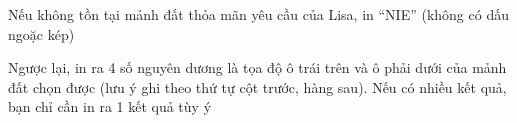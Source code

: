 Nếu không tồn tại mảnh đất thỏa mãn yêu cầu của Lisa, in “NIE” (không có dấu ngoặc kép)  

   Ngược lại, in ra 4 số nguyên dương là tọa độ ô trái trên và ô phải dưới của mảnh đất chọn được (lưu ý ghi theo thứ tự cột trước, hàng sau). Nếu có nhiều kết quả, bạn chỉ cần in ra 1 kết quả tùy ý